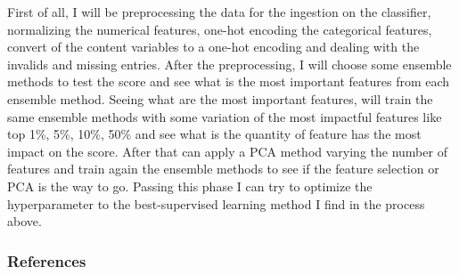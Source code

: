 \documentclass[11pt]{article}
\begin{document}
First of all, I will be preprocessing the data for the ingestion on the
classifier, normalizing the numerical features, one-hot encoding the
categorical features, convert of the content variables to a one-hot
encoding and dealing with the invalids and missing entries. After the
preprocessing, I will choose some ensemble methods to test the score and
see what is the most important features from each ensemble method.
Seeing what are the most important features, will train the same
ensemble methods with some variation of the most impactful features like
top 1\%, 5\%, 10\%, 50\% and see what is the quantity of feature has the
most impact on the score. After that can apply a PCA method varying the
number of features and train again the ensemble methods to see if the
feature selection or PCA is the way to go. Passing this phase I can try
to optimize the hyperparameter to the best-supervised learning method I
find in the process above.

    \hypertarget{references}{%
\subsubsection{References}\label{references}}
\end{document}
